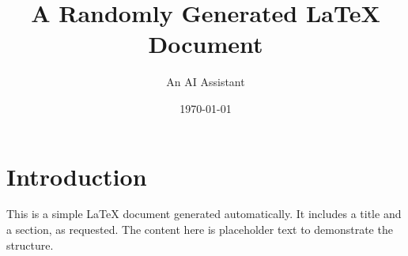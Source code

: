 \documentclass{article}
\title{A Randomly Generated LaTeX Document}
\author{An AI Assistant}
\date{\today}
\begin{document}
\maketitle

\section{Introduction}
This is a simple LaTeX document generated automatically. It includes a title and a section, as requested. The content here is placeholder text to demonstrate the structure.
\end{document}
